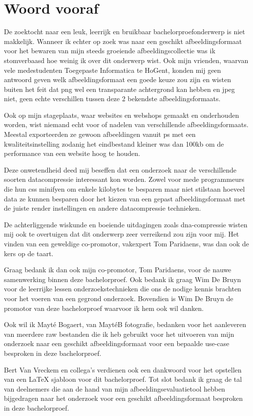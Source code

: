 
\chapter*{Woord vooraf}
\label{ch:voorwoord}

De zoektocht naar een leuk, leerrijk en bruikbaar bachelorproefonderwerp is niet makkelijk. Wanneer ik echter op zoek was naar een geschikt \gls{afbeeldingsformaat} voor het bewaren van mijn steeds groeiende afbeeldingscollectie was ik stomverbaasd hoe weinig ik over dit onderwerp wist. Ook mijn vrienden, waarvan vele medestudenten Toegepaste Informatica te HoGent, konden mij geen antwoord geven welk \gls{afbeeldingsformaat} een goede keuze zou zijn en wisten buiten het feit dat \gls{png} wel een transparante achtergrond kan hebben en \gls{jpeg} niet, geen echte verschillen tussen deze 2 bekendste \glspl{afbeeldingsformaat}.

Ook op mijn stageplaats, waar websites en webshops gemaakt en onderhouden worden, wist niemand echt voor of nadelen van verschillende \glspl{afbeeldingsformaat}. Meestal exporteerden ze gewoon afbeeldingen vanuit \gls{ps} met een kwaliteitsinstelling zodanig het eindbestand kleiner was dan 100kb om de performance van een website hoog te houden.

Deze onwetendheid deed mij beseffen dat een onderzoek naar de verschillende soorten \gls{datacompressie} interessant kon worden. Zowel voor mede programmeurs die hun \gls{css} \gls{minifyen} om enkele kilobytes te besparen maar niet stilstaan hoeveel data ze kunnen besparen door het kiezen van een gepast \gls{afbeeldingsformaat} met de juiste \gls{render} instellingen en andere \gls{datacompressie} technieken. 

De achterliggende wiskunde en boeiende uitdagingen zoals \gls{dna-compressie} wisten mij ook te overtuigen dat dit onderwerp zeer verreikend zou zijn voor mij. Het vinden van een geweldige co-promotor, vakexpert Tom Paridaens, was dan ook de kers op de taart.

\pagebreak

Graag bedank ik dan ook mijn co-promotor, Tom Paridaens, voor de nauwe samenwerking binnen deze bachelorproef. Ook bedank ik graag Wim De Bruyn voor de leerrijke lessen onderzoekstechnieken die ons de nodige kennis brachten voor het voeren van een gegrond onderzoek. Bovendien is Wim De Bruyn de promotor van deze bachelorproef waarvoor ik hem ook wil danken.

Ook wil ik Mayté Bogaert, van MaytéB fotografie, bedanken voor het aanleveren van meerdere \gls{raw} bestanden die ik heb gebruikt voor het uitvoeren van mijn onderzoek naar een geschikt \gls{afbeeldingsformaat} voor een bepaalde \gls{use-case} besproken in deze bachelorproef.

Bert Van Vreckem en collega's verdienen ook een dankwoord voor het opstellen van een \LaTeX{} sjabloon voor dit bachelorproef. Tot slot bedank ik graag de tal van deelnemers die aan de hand van mijn \gls{afbeeldingsevaluatietool} hebben bijgedragen naar het onderzoek voor een geschikt \gls{afbeeldingsformaat} besproken in deze bachelorproef.